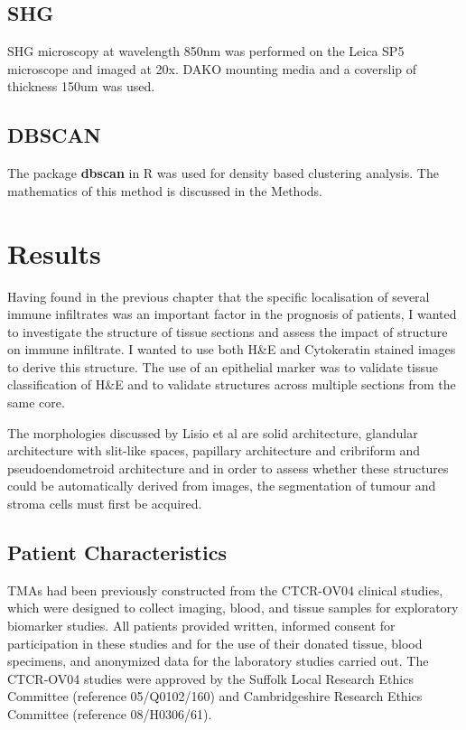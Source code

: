 \subsection{SHG}
SHG microscopy at wavelength 850nm was performed on the Leica SP5 microscope and imaged at 20x. DAKO mounting media and a coverslip of thickness 150um was used. 

\subsection{DBSCAN}
The package \textbf{dbscan} in R was used for density based clustering analysis. The mathematics of this method is discussed in the Methods. 

\section{Results}
Having found in the previous chapter that the specific localisation of several immune infiltrates was an important factor in the prognosis of patients, I wanted to investigate the structure of tissue sections and assess the impact of structure on immune infiltrate. I wanted to use both H&E and Cytokeratin stained images to derive this structure. The use of an epithelial marker was to validate tissue classification of H\&E and to validate structures across multiple sections from the same core.

The morphologies discussed by Lisio et al are solid architecture, glandular architecture with slit-like spaces, papillary architecture and cribriform and pseudoendometroid architecture\cite{Lisio2019Feb} and in order to assess whether these structures could be automatically derived from images, the segmentation of tumour and stroma cells must first be acquired. 

\subsection{Patient Characteristics}
TMAs had been previously constructed from the CTCR-OV04 clinical studies, which were designed to collect imaging, blood, and tissue samples for exploratory biomarker studies. All patients provided written, informed consent for participation in these studies and for the use of their donated tissue, blood specimens, and anonymized data for the laboratory studies carried out. The CTCR-OV04 studies were approved by the Suffolk Local Research Ethics Committee (reference 05/Q0102/160) and Cambridgeshire Research Ethics Committee (reference 08/H0306/61).\cite{}

